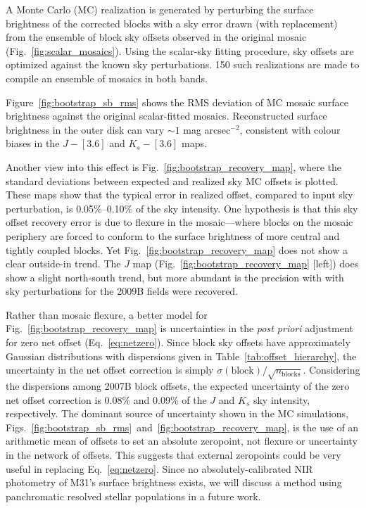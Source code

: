 \documentclass[iop]{emulateapj}
\newcommand{\Fig}[1]{Fig.~\ref{fig:#1}}  %
\newcommand{\Eq}[1]{Eq.~\ref{eq:#1}}  %
\newcommand{\Tab}[1]{Table~\ref{tab:#1}}  %
\begin{document}
A Monte Carlo (MC) realization is generated by perturbing the surface brightness of the corrected blocks with a sky error drawn (with replacement) from the ensemble of block sky offsets observed in the original mosaic (\Fig{scalar_mosaics}).
Using the scalar-sky fitting procedure, sky offsets  are optimized against the known sky perturbations.
150 such realizations are made to compile an ensemble of mosaics in both bands.

Figure~\ref{fig:bootstrap_sb_rms} shows the RMS deviation of MC mosaic surface brightness against the original scalar-fitted mosaics. Reconstructed surface brightness in the outer disk can vary $\sim 1$ mag arcsec$^{-2}$, consistent with colour biases in the $J-[3.6]$ and $K_s-[3.6]$ maps.

Another view into this effect is \Fig{bootstrap_recovery_map}, where the standard deviations between expected and realized sky MC offsets is plotted.
These maps show that the typical error in realized offset, compared to input sky perturbation, is 0.05\%--0.10\% of the sky intensity.
One hypothesis is that this sky offset recovery error is due to flexure in the mosaic---where blocks on the mosaic periphery are forced to conform to the surface brightness of more central and tightly coupled blocks.
Yet \Fig{bootstrap_recovery_map} does not show a clear outside-in trend.
The $J$ map (\Fig{bootstrap_recovery_map} [left]) does show a slight north-south trend, but more abundant is the precision with with sky perturbations for the 2009B fields were recovered.

Rather than mosaic flexure, a better model for \Fig{bootstrap_recovery_map} is uncertainties in the \textit{post priori} adjustment for zero net offset (\Eq{netzero}).
Since block sky offsets have approximately Gaussian distributions with dispersions given in \Tab{offset_hierarchy}, the uncertainty in the net offset correction is simply $\sigma(\mathrm{block})/\sqrt{n_\mathrm{blocks}}$.
Considering the dispersions among 2007B block offsets, the expected uncertainty of the zero net offset correction is 0.08\% and 0.09\% of the $J$ and $K_s$ sky intensity, respectively.
The dominant source of uncertainty shown in the MC simulations, Figs.~\ref{fig:bootstrap_sb_rms}~and~\ref{fig:bootstrap_recovery_map}, is the use of an arithmetic mean of offsets to set an absolute zeropoint, not flexure or uncertainty in the network of offsets.
This suggests that external zeropoints could be very useful in replacing \Eq{netzero}. Since no absolutely-calibrated NIR photometry of M31's surface brightness exists, we will discuss a method using panchromatic resolved stellar populations in a future work.
\end{document}

